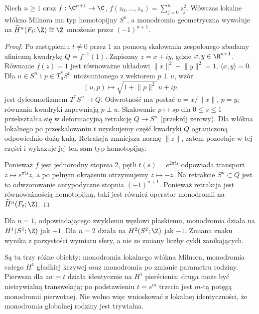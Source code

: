 \begin{twierdzenie}
\label{thm:a1-monodromy-xiv}
Niech $n\ge1$ oraz
$f:\C^{n+1}\to\C$,
$f(z_0,\dots,z_n)=\sum_{j=0}^nz_j^2$.
Wówczas lokalne włókno Milnora ma typ homotopijny $S^n$,
a monodromia geometryczna wywołuje na
$\widetilde H^n(F_t;\Z)\cong\Z$ mnożenie przez
$(-1)^{n+1}$.
\end{twierdzenie}
\begin{proof}
Po zastąpieniu $t\ne0$ przez $1$ za pomocą
skalowania zespolonego zbadamy afiniczną
kwadrykę $Q=f^{-1}(1)$. Zapiszmy $z=x+iy$,
gdzie $x,y\in\R^{n+1}$. Równanie $f(z)=1$
jest równoważne układowi
$\lVert x\rVert^2-\lVert y\rVert^2=1$,
$\langle x,y\rangle=0$.
Dla $u\in S^n$ i $p\in T_u^*S^n$ utożsamionego
z wektorem $p\perp u$, wzór
\[
(u,p)\longmapsto\sqrt{1+\lVert p\rVert^2}\,u+ip
\]
jest dyfeomorfizmem $T^*S^n\to Q$.
Odwrotność ma postać
$u=x/\lVert x\rVert$, $p=y$;
równania kwadryki zapewniają $p\perp u$.
Skalowanie $p\mapsto sp$ dla $0\le s\le1$
przekształca się w deformacyjną retrakcję
$Q\to S^n$ (przekrój zerowy).
Dla włókna lokalnego po przeskalowaniu $t$
uzyskujemy część kwadryki $Q$ ograniczoną
odpowiednio dużą kulą. Retrakcja zmniejsza
normę $\lVert z\rVert$, zatem pozostaje w tej
części i wykazuje jej ten sam typ homotopijny.

Ponieważ $f$ jest jednorodny stopnia $2$,
pętli $t(s)=e^{2\pi is}$ odpowiada transport
$z\mapsto e^{\pi is}z$, a po pełnym okrążeniu
otrzymujemy $z\mapsto-z$. Na retrakcie
$S^n\subset Q$ jest to odwzorowanie
antypodyczne stopnia $(-1)^{n+1}$.
Ponieważ retrakcja jest równoważnością
homotopijną, taki jest również operator
monodromii na $\widetilde H^n(F_t;\Z)$.
\end{proof}
\begin{przyklad}
Dla $n=1$, odpowiadającego zwykłemu węzłowi
płaskiemu, monodromia działa na $H^1(S^1;\Z)$
jak $+1$. Dla $n=2$ działa na
$H^2(S^2;\Z)$ jak $-1$. Zmiana znaku wynika z
parzystości wymiaru sfery, a nie ze zmiany
liczby cykli zanikających.
\end{przyklad}

\begin{uwaga}
Są tu trzy różne obiekty: monodromia lokalnego włókna Milnora,
monodromia całego $H^1$ gładkiej krzywej oraz monodromia
po zmianie parametru rodziny. Pierwsza dla $zw=t$ działa
identycznie na $H^1$ pierścienia; druga może być
nietrywialną transwekcją; po podstawieniu $t=s^m$
trzecia jest $m$-tą potęgą monodromii pierwotnej.
Nie wolno więc wnioskować z lokalnej identyczności, że
monodromia globalnej rodziny jest trywialna.
\end{uwaga}

